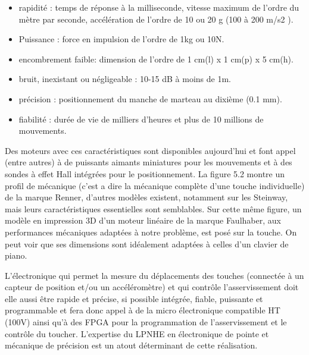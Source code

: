 \documentclass[french,a4paper,12pt]{report}
\begin{document}
\begin{itemize}
	\item  rapidité : temps de réponse à la milliseconde, vitesse maximum de l’ordre du mètre par
	seconde, accélération de l’ordre de 10 ou 20 g (100 à 200 m/s2 ).

	\item Puissance : force en impulsion de l'ordre de 1kg ou 10N.

	\item encombrement faible: dimension de l'ordre de 1 cm(l) x 1 cm(p) x 5 cm(h).

	\item bruit, inexistant ou négligeable : 10-15 dB à moins de 1m.

	\item précision : positionnement du manche de marteau au dixième (0.1 mm).

	\item fiabilité : durée de vie de milliers d'heures et plus de 10 millions de mouvements.
\end{itemize}

Des moteurs avec ces caractéristiques sont disponibles aujourd’hui et font appel (entre autres) à de puissants aimants miniatures pour les mouvements et à des sondes à effet Hall intégrées pour le positionnement. La figure 5.2 montre un profil de mécanique (c’est a dire la mécanique complète d’une touche individuelle) de la marque Renner, d’autres modèles existent, notamment sur les Steinway, mais leurs caractéristiques essentielles sont semblables. Sur cette même figure, un modèle en impression 3D d’un moteur linéaire de la marque Faulhaber, aux performances mécaniques adaptées à notre problème, est posé sur la touche. On peut voir que ses dimensions sont idéalement adaptées à celles d’un clavier de piano.

L’électronique qui permet la mesure du déplacements des touches (connectée à un capteur de position et/ou un accéléromètre) et qui contrôle l’asservissement doit elle aussi être rapide et précise, si possible intégrée, fiable, puissante et programmable et fera donc appel à de la micro électronique compatible HT (100V) ainsi qu’à des FPGA pour la programmation de l’asservissement et le contrôle du toucher. L’expertise du LPNHE en électronique de pointe et mécanique de précision est un atout déterminant de cette réalisation.
\end{document}
